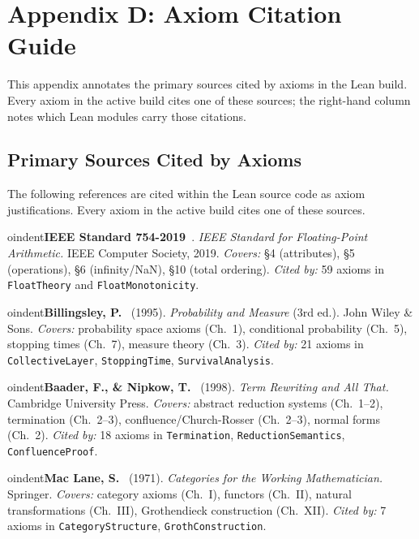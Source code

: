 \section{Appendix D: Axiom Citation Guide}
\label{app:bibliography}

This appendix annotates the primary sources cited by axioms in the Lean
build. Every axiom in the active build cites one of these sources; the
right-hand column notes which Lean modules carry those citations.

\subsection*{Primary Sources Cited by Axioms}

The following references are cited within the Lean source code as axiom
justifications. Every axiom in the active build cites one of these sources.

\medskip

oindent\textbf{IEEE Standard 754-2019}~\cite{IEEE754_2019}.
\textit{IEEE Standard for Floating-Point Arithmetic.}
IEEE Computer Society, 2019.
\textit{Covers:} §4 (attributes), §5 (operations), §6 (infinity/NaN), §10 (total ordering).
\textit{Cited by:} 59 axioms in \texttt{FloatTheory} and \texttt{FloatMonotonicity}.

\medskip

oindent\textbf{Billingsley, P.}~\cite{Billingsley1995} (1995).
\textit{Probability and Measure} (3rd ed.).
John Wiley \& Sons.
\textit{Covers:} probability space axioms (Ch.~1), conditional probability (Ch.~5),
stopping times (Ch.~7), measure theory (Ch.~3).
\textit{Cited by:} 21 axioms in \texttt{CollectiveLayer}, \texttt{StoppingTime}, \texttt{SurvivalAnalysis}.

\medskip

oindent\textbf{Baader, F., \& Nipkow, T.}~\cite{BaaderNipkow1998} (1998).
\textit{Term Rewriting and All That.}
Cambridge University Press.
\textit{Covers:} abstract reduction systems (Ch.~1--2), termination (Ch.~2--3),
confluence/Church-Rosser (Ch.~2--3), normal forms (Ch.~2).
\textit{Cited by:} 18 axioms in \texttt{Termination}, \texttt{ReductionSemantics}, \texttt{ConfluenceProof}.

\medskip

oindent\textbf{Mac Lane, S.}~\cite{MacLane1971} (1971).
\textit{Categories for the Working Mathematician.}
Springer.
\textit{Covers:} category axioms (Ch.~I), functors (Ch.~II), natural transformations (Ch.~III),
Grothendieck construction (Ch.~XII).
\textit{Cited by:} 7 axioms in \texttt{CategoryStructure}, \texttt{GrothConstruction}.

